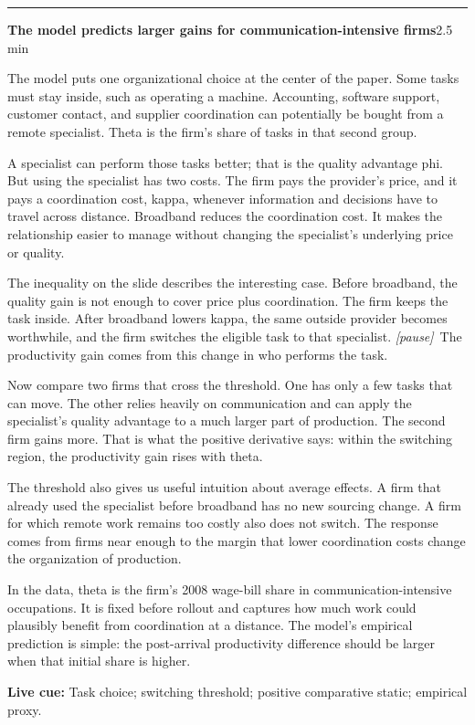 \documentclass[11pt]{article}
\newcommand{\Pause}{\textcolor{ScriptGray}{\textit{[pause]}}}
\newcommand{\Cue}[1]{\par\nobreak\smallskip\noindent\textcolor{ScriptGray}{\footnotesize
  \textbf{Live cue:} #1}\par}
\newcommand{\scriptframe}[3]{%
  \Needspace{11\baselineskip}%
  \par\medskip\noindent\textcolor{ScriptBlue}{\rule{\linewidth}{0.55pt}}%
  \par\smallskip\noindent
  \textbf{#1}\hfill\textcolor{ScriptGray}{\small #2}\par\smallskip
  #3\par}
\begin{document}
\scriptframe{The model predicts larger gains for communication-intensive firms}{2.5 min}{%
  The model puts one organizational choice at the center of the paper. Some
  tasks must stay inside, such as operating a machine. Accounting, software
  support, customer contact, and supplier coordination can potentially be
  bought from a remote specialist. Theta is the firm's share of tasks in that
  second group.

  A specialist can perform those tasks better; that is the quality advantage
  phi. But using the specialist has two costs. The firm pays the provider's
  price, and it pays a coordination cost, kappa, whenever information and
  decisions have to travel across distance. Broadband reduces the coordination
  cost. It makes the relationship easier to manage without changing the
  specialist's underlying price or quality.

  The inequality on the slide describes the interesting case. Before broadband,
  the quality gain is not enough to cover price plus coordination. The firm
  keeps the task inside. After broadband lowers kappa, the same outside provider
  becomes worthwhile, and the firm switches the eligible task to that
  specialist. \Pause\ The productivity gain comes from this change in who
  performs the task.

  Now compare two firms that cross the threshold. One has only a few tasks that
  can move. The other relies heavily on communication and can apply the
  specialist's quality advantage to a much larger part of production. The
  second firm gains more. That is what the positive derivative says: within the
  switching region, the productivity gain rises with theta.

  The threshold also gives us useful intuition about average effects. A firm
  that already used the specialist before broadband has no new sourcing change.
  A firm for which remote work remains too costly also does not switch. The
  response comes from firms near enough to the margin that lower coordination
  costs change the organization of production.

  In the data, theta is the firm's 2008 wage-bill share in
  communication-intensive occupations. It is fixed before rollout and captures
  how much work could plausibly benefit from coordination at a distance. The
  model's empirical prediction is simple: the post-arrival productivity
  difference should be larger when that initial share is higher.
  \Cue{Task choice; switching threshold; positive comparative static; empirical proxy.}
}
\end{document}
